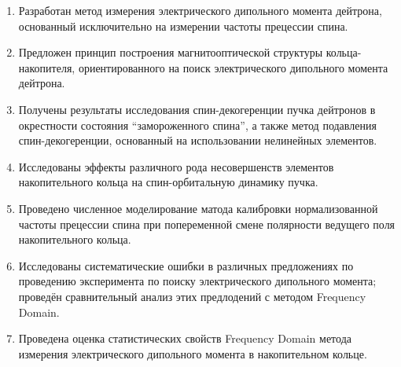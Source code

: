 
\begin{enumerate}
	\item Разработан метод измерения электрического дипольного момента дейтрона, 
	основанный исключительно на измерении частоты прецессии спина.
	\item Предложен принцип построения магнитооптической структуры кольца-накопителя, 
	ориентированного на поиск электрического дипольного момента дейтрона.
	\item Получены результаты исследования спин-декогеренции пучка дейтронов в окрестности 
	состояния ``замороженного спина'', а также метод подавления спин-декогеренции, основанный на использовании нелинейных элементов.
	\item Исследованы эффекты различного рода несовершенств элементов накопительного кольца 
	на спин-орбитальную динамику пучка.
	\item Проведено численное моделирование матода калибровки нормализованной частоты прецессии спина 
	при попеременной смене полярности ведущего поля накопительного кольца.
	\item Исследованы систематические ошибки в различных предложениях по проведению эксперимента 
	по поиску электрического дипольного момента; проведён сравнительный анализ этих предлодений 
	с методом Frequency Domain.
	\item Проведена оценка статистических свойств Frequency Domain метода измерения 
	электрического дипольного момента в накопительном кольце.
\end{enumerate}
